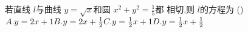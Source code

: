 \documentclass[class=ctexart,crop=false]{standalone}
\begin{document}
若直线 $l$与曲线 $y=\sqrt{x}$和圆 $x^2+y^2=\frac{1}{5}$都
相切,则 $l$的方程为 \hfill (\qquad)\\
$A. y=2x+1\hfill B. y=2x+\frac{1}{2}\hfill 
C. y=\frac{1}{2}x+1\hfill D. y=\frac{1}{2}x+\frac{1}{2}\hfill$
\end{document}
